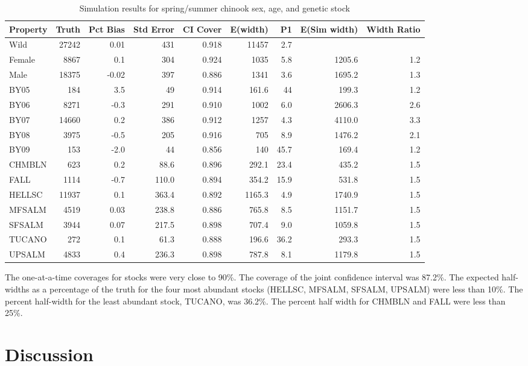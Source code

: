 \documentclass[%
                leqno,         %
%
]{nrc1}                          %
\begin{document}
\begin{table} %
\caption{Simulation results for spring/summer chinook sex, age, and genetic stock}
\label{table:CHsimresults}
\footnotesize
\begin{tabular}{ | l | r | r | r | r | r | r | r | r | }
\hline
Property&Truth&Pct Bias&Std Error&CI Cover&E(width)&P1&E(Sim width)&Width Ratio \\ \hline
Wild&27242&0.01&431&0.918&11457&2.7&& \\ \hline
Female&8867&0.1&304&0.924&1035&5.8&1205.6&1.2 \\ \hline
Male&18375&-0.02&397&0.886&1341&3.6&1695.2&1.3 \\ \hline
BY05&184&3.5&49&0.914&161.6&44&199.3&1.2 \\ \hline
BY06&8271&-0.3&291&0.910&1002&6.0&2606.3&2.6 \\ \hline
BY07&14660&0.2&386&0.912&1257&4.3&4110.0&3.3 \\ \hline
BY08&3975&-0.5&205&0.916&705&8.9&1476.2&2.1 \\ \hline
BY09&153&-2.0&44&0.856&140&45.7&169.4&1.2 \\ \hline
CHMBLN&623&0.2&88.6&0.896&292.1&23.4&435.2&1.5 \\ \hline
FALL&1114&-0.7&110.0&0.894&354.2&15.9&531.8&1.5 \\ \hline
HELLSC&11937&0.1&363.4&0.892&1165.3&4.9&1740.9&1.5 \\ \hline
MFSALM&4519&0.03&238.8&0.886&765.8&8.5&1151.7&1.5 \\ \hline
SFSALM&3944&0.07&217.5&0.898&707.4&9.0&1059.8&1.5 \\ \hline
TUCANO&272&0.1&61.3&0.888&196.6&36.2&293.3&1.5 \\ \hline
UPSALM&4833&0.4&236.3&0.898&787.8&8.1&1179.8&1.5 \\ \hline
\end{tabular}
\end{table}

The one-at-a-time coverages for stocks were very close to 90\%. The coverage of the joint confidence interval was 87.2\%. The expected half-widths as a percentage of the truth for the four most abundant stocks (HELLSC, MFSALM, SFSALM, UPSALM) were less than 10\%. The percent half-width for the least abundant stock, TUCANO, was 36.2\%. The percent half width for CHMBLN and FALL were less than 25\%.

\section*{Discussion}	
\end{document}
